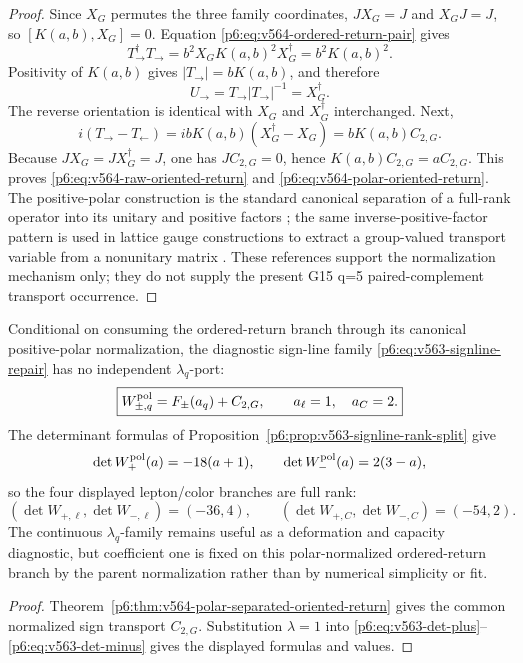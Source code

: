 \documentclass[11pt,a4paper]{article}
\begin{document}
\begin{proof}
Since \(X_G\) permutes the three family coordinates, \(JX_G=J\) and
\(X_GJ=J\), so \([K(a,b),X_G]=0\).  Equation
\eqref{p6:eq:v564-ordered-return-pair} gives
\[
 T_{\rightarrow}^\dagger T_{\rightarrow}
 =b^2X_GK(a,b)^2X_G^\dagger=b^2K(a,b)^2.
\]
Positivity of \(K(a,b)\) gives
\(|T_{\rightarrow}|=bK(a,b)\), and therefore
\[
 U_{\rightarrow}
 =T_{\rightarrow}|T_{\rightarrow}|^{-1}
 =X_G^\dagger.
\]
The reverse orientation is identical with \(X_G\) and \(X_G^\dagger\)
interchanged.  Next,
\[
 i(T_{\rightarrow}-T_{\leftarrow})
 =ibK(a,b)(X_G^\dagger-X_G)=bK(a,b)C_{2,G}.
\]
Because \(JX_G=JX_G^\dagger=J\), one has \(JC_{2,G}=0\), hence
\(K(a,b)C_{2,G}=aC_{2,G}\).  This proves
\eqref{p6:eq:v564-raw-oriented-return} and
\eqref{p6:eq:v564-polar-oriented-return}.  The positive-polar construction
is the standard canonical separation of a full-rank operator into its
unitary and positive factors \cite{Higham1986Polar}; the same
inverse-positive-factor pattern is used in lattice gauge constructions to
extract a group-valued transport variable from a nonunitary matrix
\cite{ShibataKondoShinohara2010ExactDecomposition}.  These references support
the normalization mechanism only; they do not supply the present G15 q=5 paired-complement transport occurrence.
\end{proof}

\begin{corollary}
\label{p6:cor:v564-polar-normalized-w-branch}
Conditional on consuming the ordered-return branch through its canonical
positive-polar normalization, the diagnostic sign-line family
\eqref{p6:eq:v563-signline-repair} has no independent \(\lambda_q\)-port:
\begin{equation}
\label{p6:eq:v564-polar-w-branch}
 \boxed{
 W_{\pm,q}^{\rm pol}=F_\pm(a_q)+C_{2,G},
 \qquad a_\ell=1,\quad a_C=2.}
\end{equation}
The determinant formulas of
Proposition~\ref{p6:prop:v563-signline-rank-split} give
\[
 \det W_+^{\rm pol}(a)=-18(a+1),
 \qquad
 \det W_-^{\rm pol}(a)=2(3-a),
\]
so the four displayed lepton/color branches are full rank:
\[
 (\det W_{+,\ell},\det W_{-,\ell})=(-36,4),
 \qquad
 (\det W_{+,C},\det W_{-,C})=(-54,2).
\]
The continuous \(\lambda_q\)-family remains useful as a deformation and
capacity diagnostic, but coefficient one is fixed on this polar-normalized
ordered-return branch by the parent normalization rather than by numerical
simplicity or fit.
\end{corollary}
\begin{proof}
Theorem~\ref{p6:thm:v564-polar-separated-oriented-return} gives the common
normalized sign transport \(C_{2,G}\).  Substitution \(\lambda=1\) into
\eqref{p6:eq:v563-det-plus}--\eqref{p6:eq:v563-det-minus} gives the displayed
formulas and values.
\end{proof}
\end{document}
